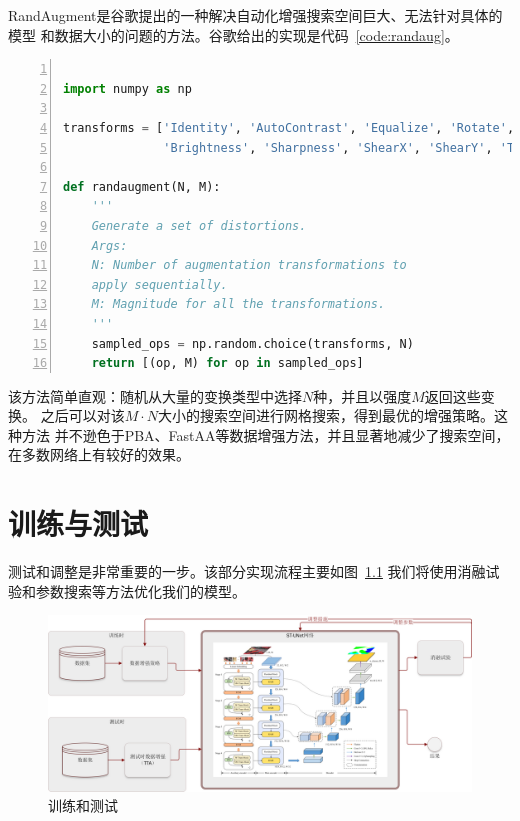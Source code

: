 \documentclass[a4paper,twoside,zihao=5,UTF8]{ctexrep}
\begin{document}
RandAugment\cite{randaug}是谷歌提出的一种解决自动化增强搜索空间巨大、无法针对具体的模型
和数据大小的问题的方法。谷歌给出的实现是代码~\ref{code:randaug}。

\begin{lstlisting}[language=Python,numbers=left,style=PythonStyle,label={code:randaug},caption=RandAugment]

import numpy as np

transforms = ['Identity', 'AutoContrast', 'Equalize', 'Rotate', 'Solarize', 'Color', 'Posterize', 'Contrast',
              'Brightness', 'Sharpness', 'ShearX', 'ShearY', 'TranslateX', 'TranslateY']

def randaugment(N, M):
    '''
    Generate a set of distortions.
    Args:
    N: Number of augmentation transformations to
    apply sequentially.
    M: Magnitude for all the transformations.
    '''
    sampled_ops = np.random.choice(transforms, N)
    return [(op, M) for op in sampled_ops]

\end{lstlisting}

该方法简单直观：随机从大量的变换类型中选择$N$种，并且以强度$M$返回这些变换。
之后可以对该$M\cdot N$大小的搜索空间进行网格搜索，得到最优的增强策略。这种方法
并不逊色于PBA、FastAA等数据增强方法，并且显著地减少了搜索空间\cite{ganaug}，
在多数网络上有较好的效果。

\chapter{训练与测试}

测试和调整是非常重要的一步。该部分实现流程主要如图~\ref{fig:modeltraining}
我们将使用消融试验和参数搜索等方法优化我们的模型。

\begin{figure}[htbp]
    \includegraphics[width=\textwidth]{model.png}
    \centering
    \caption{训练和测试}
    \label{fig:modeltraining}
\end{figure}
\end{document}

